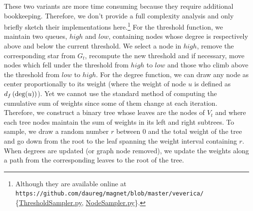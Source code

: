 These two variants are more time consuming because they require additional bookkeeping.
Therefore, we don't provide a full complexity analysis and only briefly sketch their implementations
here.\footnote{Although they are available online at
\nolinkurl{https://github.com/daureg/magnet/blob/master/veverica/}%
\{\href{https://github.com/daureg/magnet/blob/master/veverica/ThresholdSampler.py}%
{ThresholdSampler.py}, \href{https://github.com/daureg/magnet/blob/master/veverica/NodeSampler.py}%
{NodeSampler.py}\}.} For the threshold function, we
maintain two queues, $high$ and $low$, containing nodes whose degree is respectively above and below
the current threshold. We select a node \uar{} in $high$, remove the corresponding star from $G_t$,
recompute the new threshold and if necessary, move nodes which fell under the threshold from $high$
to $low$ and those who climb above the threshold from $low$ to $high$. For the degree function, we
can draw any node as center proportionally to its weight (where the weight of node $u$ is defined as
$d_f\left(\operatorname{deg}(u)\right)$). Yet we cannot use the standard method of computing the cumulative sum
of weights since some of them change at each iteration. Therefore, we construct a binary tree whose
leaves are the nodes of $V_t$ and where each tree nodes maintain the sum of weights in its left and
right subtrees. To sample, we draw a random number $r$ between $0$ and the total weight of the tree and
go down from the root to the leaf spanning the weight interval containing $r$.
When degrees are updated (or graph node removed), we update the weights along a path from the
corresponding leaves to the root of the tree.
